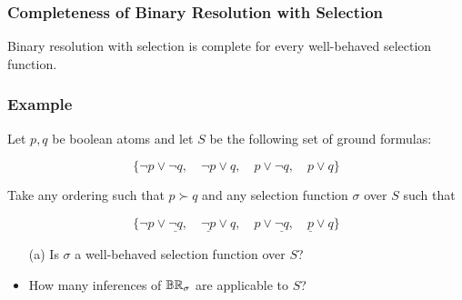 \begin{frame}
  \frametitle{Completeness of Binary Resolution with Selection}


Binary resolution with selection is \alert{complete for every
  well-behaved selection function}.

\bigskip


\end{frame}


\begin{frame}
  \frametitle{Example}

  Let $p,q$ be boolean atoms and let $S$ be the following set of
  ground formulas:

  \[ \{\lnot p \lor \lnot q, \quad \lnot p \lor q, \quad p\lor \lnot
    q, \quad p\lor q     \} \]

  Take any ordering such that $p\succ q$ and any selection function
  $\sigma$ over $S$ such that

    \[ \{\lnot p \lor \underline{\lnot q}, \quad \underline{\lnot p} \lor q, \quad p\lor \underline{\lnot
        q}, \quad \underline{p}\lor q     \} \]

    \begin{itemize}
      \item[(a)] Is $\sigma$ a well-behaved selection function over
        $S$?

        \item<2->[(b)] How many inferences of $\mathbb{BR}_{\sigma}$ are
          applicable to $S$? 
     \end{itemize}
  
   \end{frame}

